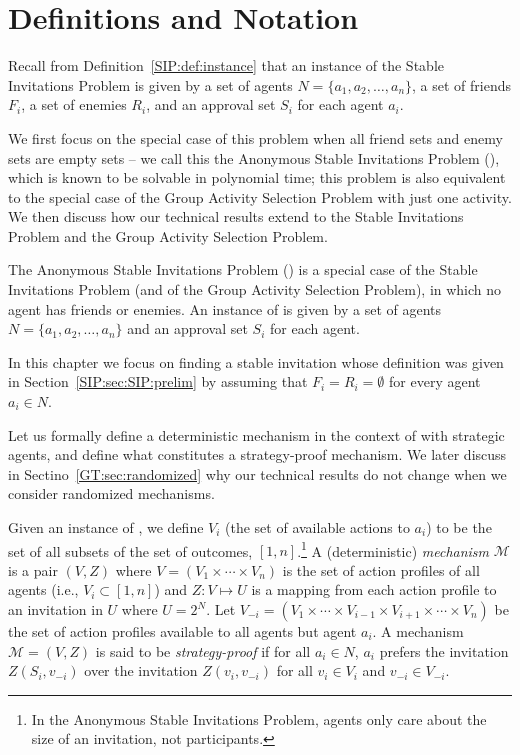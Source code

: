 \section{Definitions and Notation} \label{GT:sec:prelim}

Recall from Definition~\ref{SIP:def:instance} that an instance of the Stable Invitations Problem is given by a set of agents $N = \{a_1, a_2, \dots, a_n\}$, a set of friends $F_i$, a set of enemies $R_i$, and an approval set $S_i$ for each agent $a_i$.

We first focus on the special case of this problem when all friend sets and enemy sets are empty sets -- we call this the Anonymous Stable Invitations Problem (\ASIP), which is known to be solvable in polynomial time; this problem is also equivalent to the special case of the Group Activity Selection Problem with just one activity. We then discuss how our technical results extend to the Stable Invitations Problem and the Group Activity Selection Problem.

\begin{definition}
	The Anonymous Stable Invitations Problem (\ASIP) is a special case of the Stable Invitations Problem (and of the Group Activity Selection Problem), in which no agent has friends or enemies. An instance of \ASIPs is given by a set of agents $N = \{a_1, a_2, \dots, a_n\}$ and an approval set $S_i$ for each agent.
\end{definition}

In this chapter we focus on finding a stable invitation whose definition was given in Section~\ref{SIP:sec:SIP:prelim} by assuming that $F_i = R_i = \emptyset$ for every agent $a_i\in N$. 

Let us formally define a deterministic mechanism in the context of \ASIPs with strategic agents, and define what constitutes a strategy-proof mechanism. We later discuss in Sectino~\ref{GT:sec:randomized} why our technical results do not change when we consider randomized mechanisms.

\begin{definition} \label{GT:def:mechanism}
Given an instance of \ASIP, we define $V_i$ (the set of available actions to $a_i$) to be the set of all subsets of the set of outcomes, $[1, n]$.\footnote{In the Anonymous Stable Invitations Problem, agents only care about the size of an invitation, not participants.} 
A (deterministic) \emph{mechanism} $\mathcal{M}$ is a pair $(V, Z)$ where $V = (V_1 \times \cdots \times V_n)$ is the set of action profiles of all agents (i.e., $V_i \subset [1,n]$) and $Z: V \mapsto U$ is a mapping from each action profile to an invitation in $U$ where $U = 2^{N}$. 
Let $V_{-i} = (V_1 \times \cdots \times V_{i-1} \times V_{i+1} \times \cdots \times V_{n})$ be the set of action profiles available to all agents but agent $a_i$. A mechanism $\mathcal{M} = (V, Z)$ is said to be \emph{strategy-proof} if for all $a_i\in N$, $a_i$ prefers the invitation $Z(S_i, v_{-i})$ over the invitation $Z(v_i, v_{-i})$ for all $v_i \in V_i$ and $v_{-i} \in V_{-i}$.
\end{definition}

